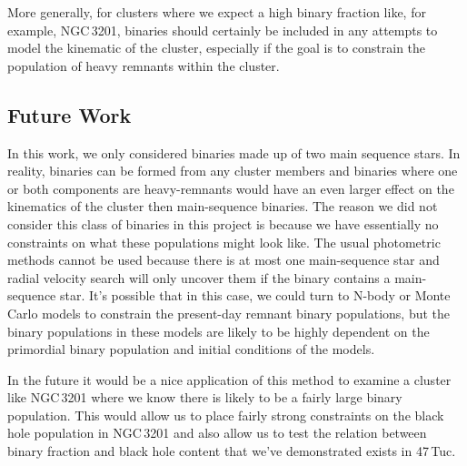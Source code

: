 More generally, for clusters where we expect a high binary fraction like, for example, NGC\,3201,
binaries should certainly be included in any attempts to model the kinematic of the cluster,
especially if the goal is to constrain the population of heavy remnants within the cluster.



\subsection{Future Work}



In this work, we only considered binaries made up of two main sequence stars. In reality, binaries
can be formed from any cluster members and binaries where one or both components are heavy-remnants
would have an even larger effect on the kinematics of the cluster then main-sequence binaries. The
reason we did not consider this class of binaries in this project is because we have essentially no
constraints on what these populations might look like. The usual photometric methods cannot be used
because there is at most one main-sequence star and radial velocity search will only uncover them if
the binary contains a main-sequence star. It's possible that in this case, we could turn to N-body
or Monte Carlo models to constrain the present-day remnant binary populations, but the binary
populations in these models are likely to be highly dependent on the primordial binary population
and initial conditions of the models.

In the future it would be a nice application of this method to examine a cluster like NGC\,3201
where we know there is likely to be a fairly large binary population. This would allow us to place
fairly strong constraints on the black hole population in NGC\,3201 and also allow us to test the
relation between binary fraction and black hole content that we've demonstrated exists in 47\,Tuc. 